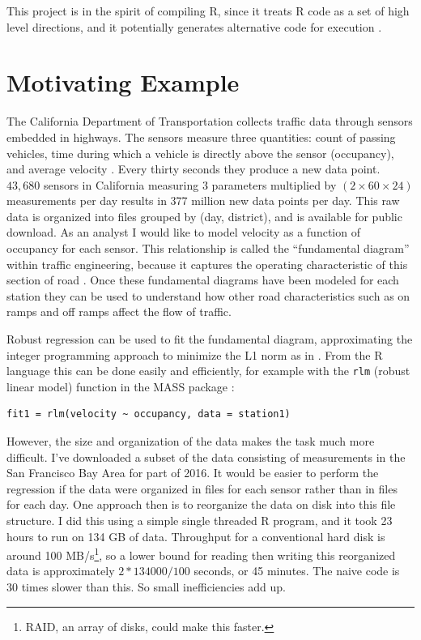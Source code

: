 \documentclass[12pt]{article}
\begin{document}
This project is in the spirit of compiling R, since it treats R code as
a set of high level directions, and it potentially generates alternative
code for execution \cite{lang2014enhancing}.

\section{Motivating Example}
\label{sec:pems}

The California Department of Transportation collects traffic data through
sensors embedded in highways. The sensors measure three quantities: count
of passing vehicles, time during which a vehicle is directly above the
sensor (occupancy), and average velocity \cite{jia2001pems}.  Every thirty
seconds they produce a new data point. $43,680$ sensors in California
measuring 3 parameters multiplied by $(2 \times 60 \times 24)$ measurements
per day results in 377 million new data points per day.  This raw data is
organized into files grouped by (day, district), and is available for
public download.  As an analyst I would like to model velocity as a
function of occupancy for each sensor. This relationship is called the
``fundamental diagram'' within traffic engineering, because it captures the
operating characteristic of this section of road
\cite{daganzo1997fundamentals}. Once these fundamental diagrams have been
modeled for each station they can be used to understand how other road
characteristics such as on ramps and off ramps affect the flow of traffic.

Robust regression can be used to fit the fundamental diagram, approximating
the integer programming approach to minimize the L1 norm as in
\cite{li2011fundamental}.  From the R language this can be done easily and
efficiently, for example with the \texttt{rlm} (robust linear model)
function in the MASS package \cite{venables2013modern}:

\begin{verbatim}
fit1 = rlm(velocity ~ occupancy, data = station1)
\end{verbatim}

However, the size and organization of the data makes the task much more
difficult.  I've downloaded a subset of the data consisting of measurements
in the San Francisco Bay Area for part of 2016.  It would be easier to
perform the regression if the data were organized in files for each sensor
rather than in files for each day.  One approach then is to reorganize the
data on disk into this file structure. I did this using a simple single
threaded R program, and it took 23 hours to run on 134 GB of data.
Throughput for a conventional hard disk is around 100 MB/s\footnote{RAID,
an array of disks, could make this faster.}, so a lower bound for reading
then writing this reorganized data is approximately $2 * 134000 / 100$
seconds, or 45 minutes. The naive code is 30 times slower than this. So
small inefficiencies add up.
\end{document}
